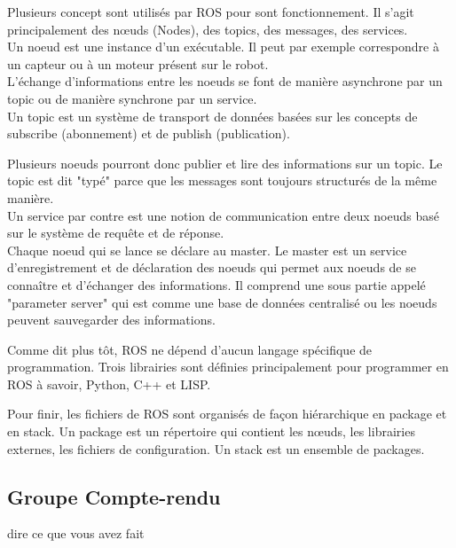 Plusieurs concept sont utilisés par ROS pour sont fonctionnement. Il s'agit principalement des nœuds (Nodes), des topics, des messages, des services. \\

Un noeud est une instance d'un exécutable. Il peut par exemple correspondre à un capteur ou à un moteur présent sur le robot.\\

L'échange d'informations entre les noeuds se font de manière asynchrone par un topic ou de manière synchrone par un service.\\

Un topic est un système de transport de données basées sur les concepts de subscribe (abonnement) et de publish (publication).

Plusieurs noeuds pourront donc publier et lire des informations sur un topic. Le topic est dit "typé" parce que les messages sont toujours structurés de la même manière.\\

Un service par contre est une notion de communication entre deux noeuds basé sur le système de requête et de réponse.\\

Chaque noeud qui se lance se déclare au master.
Le master est un service d'enregistrement et de déclaration des noeuds qui permet aux noeuds de se connaître et d'échanger des informations. Il comprend une sous partie appelé "parameter server" qui est comme une base de données centralisé ou les noeuds peuvent sauvegarder des informations.\\



Comme dit plus tôt, ROS ne dépend d’aucun langage spécifique de programmation. Trois librairies sont définies principalement pour programmer en ROS à savoir, Python, C++ et LISP.

Pour finir, les fichiers de ROS sont organisés  de façon hiérarchique en package et en stack. Un package est un répertoire qui contient les nœuds, les librairies externes, les fichiers de configuration. Un stack est un ensemble de packages.


\subsection{Groupe Compte-rendu}
dire ce que vous avez fait